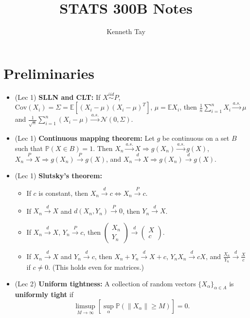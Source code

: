 \documentclass[twoside]{article}
\newcommand{\dis}{\displaystyle}
\newcommand\bbE{\mathbb{E}}
\newcommand\bbP{\mathbb{P}}
\newcommand\calN{\mathcal{N}}
\newcommand\Sg{\Sigma}
\newcommand\cas{\stackrel{a.s.}{\goesto}}
\newcommand\cd{\stackrel{d}{\goesto}}
\newcommand\cp{\stackrel{P}{\goesto}}
\newcommand\goesto{\rightarrow}
\begin{document}
\title{STATS 300B Notes}
\author{Kenneth Tay}
\date{\vspace{-3ex}}
\maketitle

\section{Preliminaries}
\begin{itemize}
\item (Lec 1) \textbf{SLLN and CLT:} If $X \stackrel{iid}{\sim} P$, $\text{Cov}(X_i) = \Sg = \bbE [(X_i - \mu)(X_i - \mu)^T]$, $\mu = \bbE X_i$, then $\dis\frac{1}{n}\sum_{i=1}^n X_i \cas \mu$ and $\dis\frac{1}{\sqrt{n}}\sum_{i=1}^n (X_i-\mu) \cas \calN(0, \Sg)$.

\item (Lec 1) \textbf{Continuous mapping theorem:} Let $g$ be continuous on a set $B$ such that $\bbP(X \in B)=1$. Then $X_n \cas X \Rightarrow g(X_n) \cas g(X)$, $X_n \cp X \Rightarrow g(X_n) \cp g(X)$, and $X_n \cd X \Rightarrow g(X_n) \cd g(X)$.

\item (Lec 1) \textbf{Slutsky's theorem:}
\begin{itemize}
\item If $c$ is constant, then $X_n \cd c\iff X_n \cp c$.

\item If $X_n \cd X$ and $d(X_n,Y_n) \cp 0$, then $Y_n \cd X$.

\item If $X_n \cd X$, $Y_n \cp c$, then $\left( \begin{array}{c} X_n \\ Y_n \end{array} \right) \cd \left( \begin{array}{c} X \\ c \end{array} \right)$.

\item If $X_n \cd X$ and $Y_n \cd c$, then $X_n+Y_n \cd X+c$, $Y_nX_n \cd cX$, and $\frac{X_n}{Y_n} \cd \frac{X}{c}$ if $c \neq 0$. (This holds even for matrices.)
\end{itemize}

\item (Lec 2) \textbf{Uniform tightness:} A collection of random vectors $\{ X_\alpha\}_{\alpha \in A}$ is \textbf{uniformly tight} if $$\dis\limsup_{M \goesto \infty} \left[ \sup_\alpha \bbP(\|X_\alpha\| \geq M) \right] = 0.$$


\end{itemize}
\end{document}

